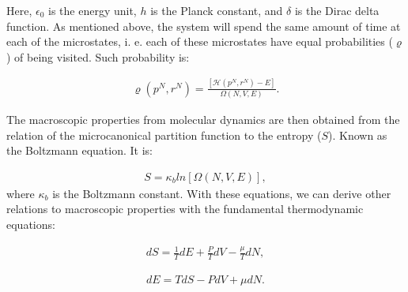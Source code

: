 \documentclass[
	12pt,				%
	openany,			%
	oneside,			%
	a4paper,			%
	english,			%
	brazil				%
	]{abntex2}
\providecommand{\DIFaddbegin}{}
\providecommand{\DIFaddend}{}
\providecommand{\DIFdelbegin}{}
\providecommand{\DIFdelend}{}
\providecommand{\DIFaddbegin}{} %
\providecommand{\DIFaddend}{} %
\providecommand{\DIFdelbegin}{} %
\providecommand{\DIFdelend}{} %
\begin{document}
Here, $\epsilon _{0}$ is the energy unit, $h$ is the Planck constant, and $\delta$ is the Dirac delta function. As mentioned above, the system will spend the same amount of time at each of the microstates, i. e. each of these microstates have equal probabilities ($\varrho$) of being visited. Such probability is:

\begin{equation}
\begin{aligned}
\varrho (p^{N},r^{N}) = \frac{[\mathcal{H}(p^{N},r^{N}) -E]}{ \Omega (N,V,E)} .
\end{aligned}
\end{equation}

The macroscopic properties from molecular dynamics are then obtained from the relation of the microcanonical partition function to the entropy ($S$). Known as the Boltzmann equation. It is:

\begin{equation}
\begin{aligned}
S = \kappa_{b} ln [\Omega (N,V,E)], 
\end{aligned}
\end{equation}
where $\kappa_{b}$ is the Boltzmann constant. With these equations, we can derive other relations to macroscopic properties with the fundamental thermodynamic equations:

\begin{equation}
\DIFdelbegin %
\DIFdelend \DIFaddbegin \begin{aligned}
dS = \frac{1}{T} dE + \frac{P}{T} dV - \frac{\mu}{T} dN,
\end{aligned}
\DIFaddend \end{equation}

\begin{equation}
\DIFdelbegin %
\DIFdelend \DIFaddbegin \label{eq:fteq}
\begin{aligned}
dE =  T dS - P dV + \mu dN .
\end{aligned}
\DIFaddend \end{equation}
\end{document}
